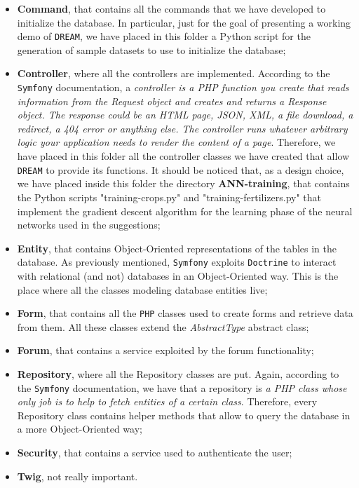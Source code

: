 \documentclass{article}
\begin{document}
\begin{itemize}
    \item \textbf{Command}, that contains all the commands that we have developed to initialize the database. In particular, just for the goal of presenting a working demo of \verb|DREAM|, we have placed in this folder a Python script for the generation of sample datasets to use to initialize the database;
    \item \textbf{Controller}, where all the controllers are implemented. According to the \verb|Symfony| documentation, a \textit{controller is a PHP function you create that reads information from the Request object and creates and returns a Response object. The response could be an HTML page, JSON, XML, a file download, a redirect, a 404 error or anything else. The controller runs whatever arbitrary logic your application needs to render the content of a page}. Therefore, we have placed in this folder all the controller classes we have created that allow \verb|DREAM| to provide its functions. It should be noticed that, as a design choice, we have placed inside this folder the directory \textbf{ANN-training}, that contains the Python scripts "training-crops.py" and "training-fertilizers.py" that implement the gradient descent algorithm for the learning phase of the neural networks used in the suggestions;
    \item \textbf{Entity}, that contains Object-Oriented representations of the tables in the database. As previously mentioned, \verb|Symfony| exploits \verb|Doctrine| to interact with relational (and not) databases in an Object-Oriented way. This is the place where all the classes modeling database entities live;
    \item \textbf{Form}, that contains all the \verb|PHP| classes used to create forms and retrieve data from them. All these classes extend the \textit{AbstractType} abstract class;
    \item \textbf{Forum}, that contains a service exploited by the forum functionality;
    \item \textbf{Repository}, where all the Repository classes are put. Again, according to the \verb|Symfony| documentation, we have that a repository is \textit{a PHP class whose only job is to help to fetch entities of a certain class}. Therefore, every Repository class contains helper methods that allow to query the database in a more Object-Oriented way;
    \item \textbf{Security}, that contains a service used to authenticate the user;
    \item \textbf{Twig}, not really important.
\end{itemize}
\newpage
\end{document}

